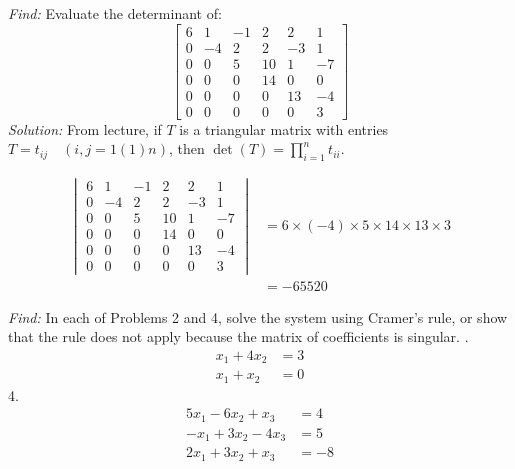 \documentclass[11pt]{homework}
\begin{document}
\maketitle

\question
\emph{Find:}
\newline
Evaluate the determinant of:
\begin{equation*}
  \begin{bmatrix}
  6 & 1 & -1 & 2 & 2 & 1 \\
  0 & -4 & 2 & 2 & -3 & 1 \\
  0 & 0 & 5 & 10 & 1 & -7 \\
  0 & 0 & 0 & 14 & 0 & 0 \\
  0 & 0 & 0 & 0 & 13 & -4 \\
  0 & 0 & 0 & 0 & 0 & 3
  \end{bmatrix}
\end{equation*}
\emph{Solution:}
\newline
From lecture, if $T$ is a triangular matrix with entries $T = t_{ij} \quad ( i,j = 1 (1) n)$,
then $\det (T) = \prod_{i=1}^{n} t_{ii}$.

\begin{align*}
  \begin{vmatrix}
  6 & 1 & -1 & 2 & 2 & 1 \\
  0 & -4 & 2 & 2 & -3 & 1 \\
  0 & 0 & 5 & 10 & 1 & -7 \\
  0 & 0 & 0 & 14 & 0 & 0 \\
  0 & 0 & 0 & 0 & 13 & -4 \\
  0 & 0 & 0 & 0 & 0 & 3
  \end{vmatrix}
  &=
  6 \times (-4) \times 5 \times 14 \times 13 \times 3 \\
  &= -65520
\end{align*}

\newpage
{}
\emph{Find:}
\newline
In each of Problems 2 and 4, solve the system using 
Cramer's rule, 
or show that the rule does not apply because the matrix of coefficients is singular.
. 
\begin{align*}
  x_1 + 4 x_2 &= 3 \\
  x_1 +  x_2 &= 0
\end{align*}
4. 
\begin{align*}
  5 x_1 - 6 x_2 +x_3 &= 4 \\
  -x_1 + 3 x_2 - 4 x_3 &= 5\\
  2 x_1 + 3 x_2 + x_3 &= -8 
\end{align*}
\end{document}
